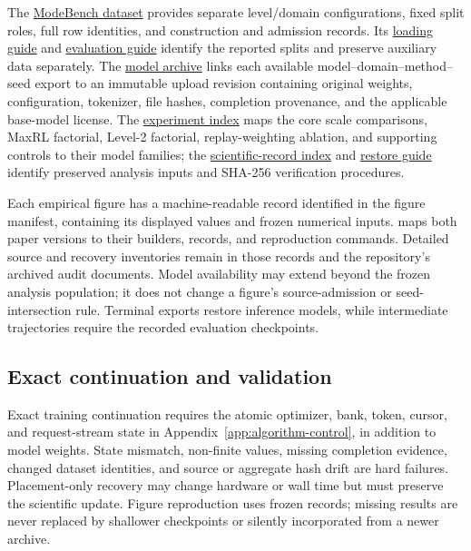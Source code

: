\documentclass{article}
\newcommand{\1}{\mathbf 1}
\theoremstyle{remark}
\theoremstyle{definition}
\theoremstyle{plain}
\begin{document}
The \href{https://huggingface.co/datasets/od2961/ModeBench}{ModeBench dataset}
provides separate level/domain configurations, fixed split roles, full row
identities, and construction and admission records. Its
\href{https://huggingface.co/datasets/od2961/ModeBench\#loading}{loading guide}
and \href{https://huggingface.co/datasets/od2961/ModeBench\#evaluation}{evaluation guide}
identify the reported splits and preserve auxiliary data separately.
The \href{https://huggingface.co/od2961/maxent-grpo-models}{model archive}
links each available model--domain--method--seed export to an immutable
upload revision containing original weights, configuration, tokenizer,
file hashes, completion provenance, and the applicable base-model license.
The \href{https://huggingface.co/od2961/maxent-grpo-models/blob/main/EXPERIMENTS.md}{experiment index}
maps the core scale comparisons, MaxRL factorial, Level-2 factorial,
replay-weighting ablation, and supporting controls to their model families;
the \href{https://huggingface.co/od2961/maxent-grpo-models/blob/main/DATA.md}{scientific-record index}
and \href{https://huggingface.co/od2961/maxent-grpo-models/blob/main/RESTORE.md}{restore guide}
identify preserved analysis inputs and SHA-256 verification procedures.

Each empirical figure has a machine-readable record identified in the
figure manifest, containing its displayed values and frozen numerical inputs.
 maps both paper versions to their builders,
records, and reproduction commands. Detailed source and recovery inventories
remain in those records and the repository's archived audit documents.
Model availability may extend beyond the frozen analysis population; it
does not change a figure's source-admission or seed-intersection rule.
Terminal exports restore inference models, while intermediate trajectories
require the recorded evaluation checkpoints.

\subsection{Exact continuation and validation}
\label{app:repro-recovery}

Exact training continuation requires the atomic optimizer, bank, token,
cursor, and request-stream state in Appendix~\ref{app:algorithm-control},
in addition to model weights. State mismatch, non-finite values, missing
completion evidence, changed dataset identities, and source or aggregate
hash drift are hard failures. Placement-only recovery may change hardware
or wall time but must preserve the scientific update. Figure reproduction
uses frozen records; missing results are never replaced by shallower
checkpoints or silently incorporated from a newer archive.
\end{document}
